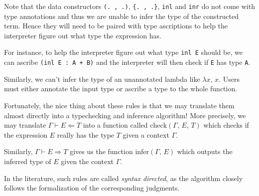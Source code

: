 \documentclass{article}
\begin{document}
\begin{enumerate}
Note that the data constructors \verb|(. , .)|, \verb|{. , .}|, \verb|inl| and 
\verb|inr| do not come with type annotations and thus we are unable to infer the
type of the constructed term.
Hence they will need to be paired with type ascriptions to
help the interpreter figure out what type the expression has.

For instance, to help the interpreter figure out what type \verb|inl E| should be,
we can ascribe \verb|(inl E : A + B)| and the interpreter will then check if
\verb|E| has type \verb|A|.

Similarly, we can't infer the type of an unannotated lambda like $\lambda x, \, x$.
Users must either annotate the input type or ascribe a type to the whole function.

Fortunately, the nice thing about these rules is that we may translate them almost
directly into a typechecking and inference algorithm!
More precisely, we may translate $\Gamma \vdash E \Leftarrow T$ into a
function called $\text{check}(\Gamma, \, E, \, T)$ which checks if the
expression $E$ really has the type $T$ given a context $\Gamma$.

Similarly, $\Gamma \vdash E \Rightarrow T$ gives us the function
$\text{infer}(\Gamma, \, E)$ which outputs the inferred type of $E$ given
the context $\Gamma$.

In the literature, such rules are called \textit{syntax directed}, as the
algorithm closely follows the formalization of the corresponding judgments.





\end{enumerate}
\end{document}
